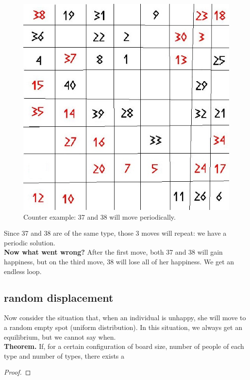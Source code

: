 \documentclass{article}
\begin{document}
\begin{figure}[!ht]
\begin{center}
\includegraphics[scale=0.25]{segregation_tegenvb_3.jpg}
\end{center}
\caption{Counter example: 37 and 38 will move periodically.}\label{counterexample3}
\end{figure}
Since 37 and 38 are of the same type, those 3 moves will repeat: we have a periodic solution.\\
\textbf{Now what went wrong?} After the first move, both 37 and 38 will gain happiness, but on the third move, 38 will lose all of her happiness. We get an endless loop.\\
\newpage
\subsection{random displacement}
Now consider the situation that, when an individual is unhappy, she will move to a random empty spot (uniform distribution). In this situation, we always get an equilibrium, but we cannot say when.\\
\textbf{Theorem.} If, for a certain configuration of board size, number of people of each type and number of types, there exists a
\begin{proof}

\end{proof}
\end{document}
